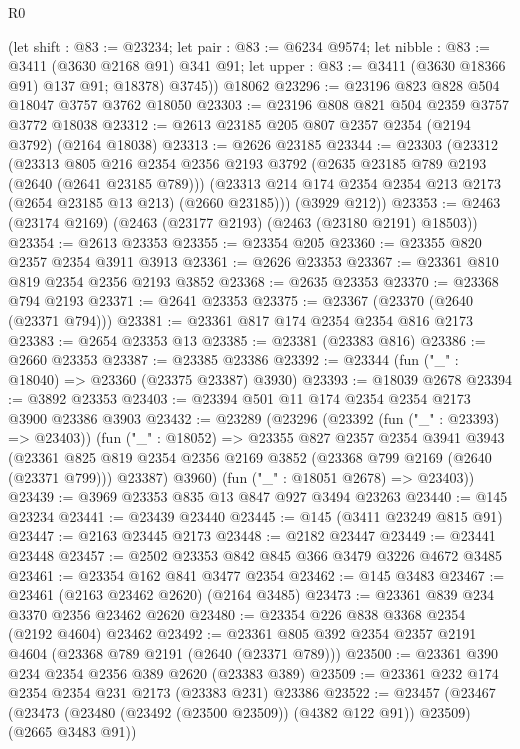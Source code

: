 \begin{lexlean}{R0}
\begin{coremodule}
        (let shift : @83 := @23234;
        let pair : @83 := @6234 @9574;
        let nibble : @83 := @3411 (@3630 @2168 @91) @341 @91;
        let upper : @83 := @3411 (@3630 @18366 @91) @137 @91; @18378)
        @3745))
    @18062
@23296 := @23196 @823 @828 @504 @18047 @3757 @3762 @18050
@23303 := @23196 @808 @821 @504 @2359 @3757 @3772 @18038
@23312 := @2613 @23185 @205 @807 @2357 @2354 (@2194 @3792) (@2164 @18038)
@23313 := @2626 @23185
@23344 := @23303
    (@23312
      (@23313
        @805
        @216
        @2354
        @2356
        @2193
        @3792
        (@2635 @23185 @789 @2193 (@2640 (@2641 @23185 @789)))
        (@23313 @214 @174 @2354 @2354 @213 @2173 (@2654 @23185 @13 @213) (@2660 @23185)))
      (@3929 @212))
@23353 := @2463 (@23174 @2169) (@2463 (@23177 @2193) (@2463 (@23180 @2191) @18503))
@23354 := @2613 @23353
@23355 := @23354 @205
@23360 := @23355 @820 @2357 @2354 @3911 @3913
@23361 := @2626 @23353
@23367 := @23361 @810 @819 @2354 @2356 @2193 @3852
@23368 := @2635 @23353
@23370 := @23368 @794 @2193
@23371 := @2641 @23353
@23375 := @23367 (@23370 (@2640 (@23371 @794)))
@23381 := @23361 @817 @174 @2354 @2354 @816 @2173
@23383 := @2654 @23353 @13
@23385 := @23381 (@23383 @816)
@23386 := @2660 @23353
@23387 := @23385 @23386
@23392 := @23344 (fun ("_" : @18040) => @23360 (@23375 @23387) @3930)
@23393 := @18039 @2678
@23394 := @3892 @23353
@23403 := @23394 @501 @11 @174 @2354 @2354 @2173 @3900 @23386 @3903
@23432 := @23289
    (@23296
      (@23392 (fun ("_" : @23393) => @23403))
      (fun ("_" : @18052) =>
      @23355
        @827
        @2357
        @2354
        @3941
        @3943
        (@23361 @825 @819 @2354 @2356 @2169 @3852 (@23368 @799 @2169 (@2640 (@23371 @799))) @23387)
        @3960)
      (fun ("_" : @18051 @2678) => @23403))
@23439 := @3969 @23353 @835 @13 @847 @927 @3494 @23263
@23440 := @145 @23234
@23441 := @23439 @23440
@23445 := @145 (@3411 @23249 @815 @91)
@23447 := @2163 @23445 @2173
@23448 := @2182 @23447
@23449 := @23441 @23448
@23457 := @2502 @23353 @842 @845 @366 @3479 @3226 @4672 @3485
@23461 := @23354 @162 @841 @3477 @2354
@23462 := @145 @3483
@23467 := @23461 (@2163 @23462 @2620) (@2164 @3485)
@23473 := @23361 @839 @234 @3370 @2356 @23462 @2620
@23480 := @23354 @226 @838 @3368 @2354 (@2192 @4604) @23462
@23492 := @23361 @805 @392 @2354 @2357 @2191 @4604 (@23368 @789 @2191 (@2640 (@23371 @789)))
@23500 := @23361 @390 @234 @2354 @2356 @389 @2620 (@23383 @389)
@23509 := @23361 @232 @174 @2354 @2354 @231 @2173 (@23383 @231) @23386
@23522 := @23457
    (@23467 (@23473 (@23480 (@23492 (@23500 @23509)) (@4382 @122 @91)) @23509) (@2665 @3483 @91))

\end{coremodule}
\end{lexlean}
